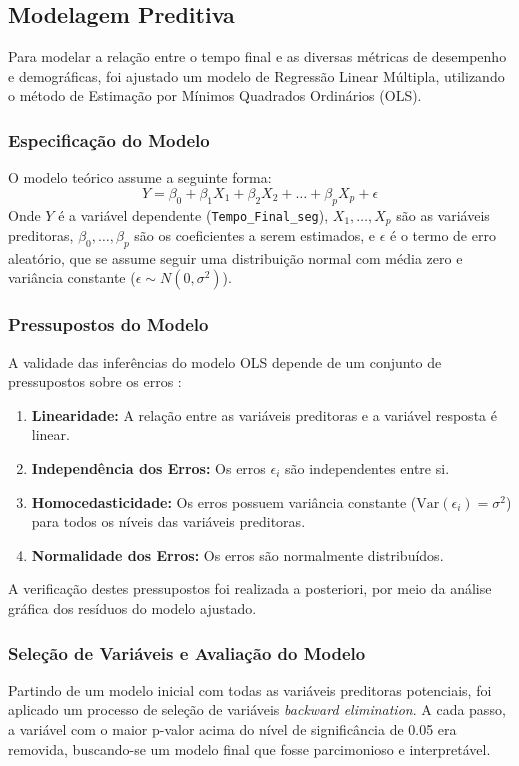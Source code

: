 \subsection{Modelagem Preditiva}
Para modelar a relação entre o tempo final e as diversas métricas de desempenho e demográficas, foi ajustado um modelo de Regressão Linear Múltipla, utilizando o método de Estimação por Mínimos Quadrados Ordinários (OLS).

\subsubsection{Especificação do Modelo}
O modelo teórico assume a seguinte forma:
$$ Y = \beta_0 + \beta_1 X_1 + \beta_2 X_2 + \dots + \beta_p X_p + \epsilon $$
Onde $Y$ é a variável dependente (\texttt{Tempo\_Final\_seg}), $X_1, \dots, X_p$ são as variáveis preditoras, $\beta_0, \dots, \beta_p$ são os coeficientes a serem estimados, e $\epsilon$ é o termo de erro aleatório, que se assume seguir uma distribuição normal com média zero e variância constante ($\epsilon \sim N(0, \sigma^2)$).

\subsubsection{Pressupostos do Modelo}
A validade das inferências do modelo OLS depende de um conjunto de pressupostos sobre os erros \citep{montgomery2012}:
\begin{enumerate}
    \item \textbf{Linearidade:} A relação entre as variáveis preditoras e a variável resposta é linear.
    \item \textbf{Independência dos Erros:} Os erros $\epsilon_i$ são independentes entre si.
    \item \textbf{Homocedasticidade:} Os erros possuem variância constante ($\text{Var}(\epsilon_i) = \sigma^2$) para todos os níveis das variáveis preditoras.
    \item \textbf{Normalidade dos Erros:} Os erros são normalmente distribuídos.
\end{enumerate}
A verificação destes pressupostos foi realizada a posteriori, por meio da análise gráfica dos resíduos do modelo ajustado.

\subsubsection{Seleção de Variáveis e Avaliação do Modelo}
Partindo de um modelo inicial com todas as variáveis preditoras potenciais, foi aplicado um processo de seleção de variáveis \textit{backward elimination}. A cada passo, a variável com o maior p-valor acima do nível de significância de 0.05 era removida, buscando-se um modelo final que fosse parcimonioso e interpretável.


